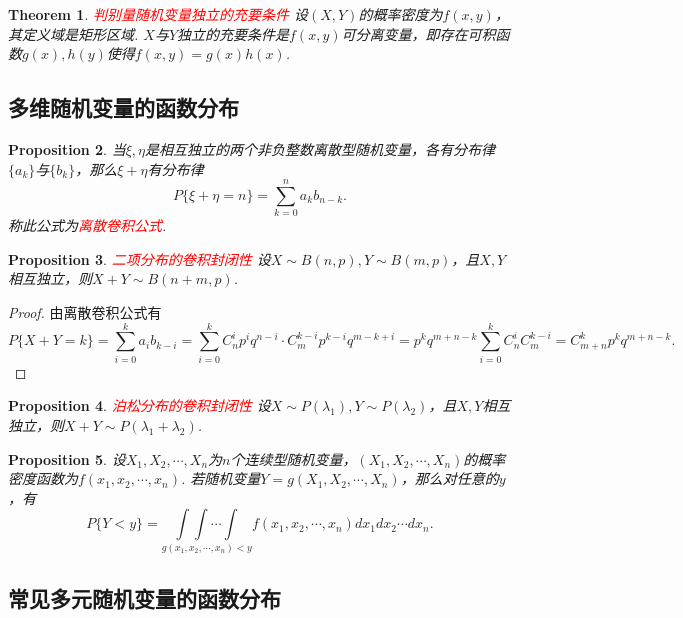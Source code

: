 \documentclass{article}
\newtheorem{theorem}{Theorem}[section]
\newtheorem{proposition}[theorem]{Proposition}
\newcommand{\redt}[1]{\textcolor{red}{#1}}
\begin{document}
\begin{theorem}
\rm \redt{判别量随机变量独立的充要条件} 设$(X,Y)$的概率密度为$f(x,y)$，其定义域是矩形区域. $X$与$Y$独立的充要条件是$f(x,y)$可分离变量，即存在可积函数$g(x),h(y)$使得$f(x,y)=g(x)h(x)$. 
\end{theorem}

\subsection{多维随机变量的函数分布}

\begin{proposition}
\rm 当$\xi,\eta$是相互独立的两个非负整数离散型随机变量，各有分布律$\{a_k\}$与$\{b_k\}$，那么$\xi+\eta$有分布律
$$
P\{\xi+\eta = n\} = \sum\limits_{k=0}^n a_kb_{n-k}. 
$$
称此公式为\redt{离散卷积公式}.
\end{proposition}

\begin{proposition}
\rm \redt{二项分布的卷积封闭性} 设$X\sim B(n,p),Y\sim B(m,p)$，且$X,Y$相互独立，则$X+Y \sim B(n+m,p)$.
\end{proposition}

\begin{proof}
\rm 由离散卷积公式有
$$
P\{X+Y = k\} = \sum\limits_{i=0}^k a_ib_{k-i} = \sum\limits_{i=0}^k C_n^i p^iq^{n-i} \cdot C_m^{k-i}p^{k-i}q^{m-k+i} = p^{k}q^{m+n-k} \sum\limits_{i=0}^k C_n^i C_m^{k-i} = C_{m+n}^k p^{k}q^{m+n-k}. 
$$
\end{proof}

\begin{proposition}
\rm \redt{泊松分布的卷积封闭性} 设$X \sim P(\lambda_1),Y \sim P(\lambda_2)$，且$X,Y$相互独立，则$X+Y \sim P(\lambda_1 + \lambda_2)$. 
\end{proposition}

\begin{proposition}
\rm 设$X_1,X_2,\cdots,X_n$为$n$个连续型随机变量，$(X_1,X_2,\cdots,X_n)$的概率密度函数为$f(x_1,x_2,\cdots,x_n)$. 若随机变量$Y=g(X_1,X_2,\cdots,X_n)$，那么对任意的$y$，有
$$
P\{Y < y\} = \underset{g(x_1,x_2,\cdots,x_n) < y}{\int\int\cdots\int}f(x_1,x_2,\cdots,x_n)dx_1dx_2\cdots dx_n.
$$
\end{proposition}


\subsection{常见多元随机变量的函数分布}
\end{document}
